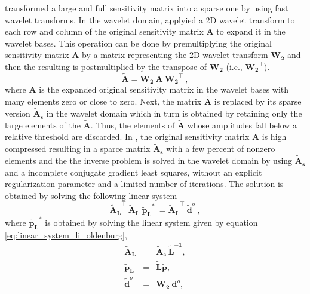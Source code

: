 \cite{li-oldenburg2010} transformed a large and full sensitivity matrix into a sparse one by using fast wavelet transforms.
In the wavelet domain, \cite{li-oldenburg2010} applyied a 2D wavelet transform to each row and column of the original sensitivity matrix $\mathbf{A}$ to expand it in the wavelet bases. 
This operation can be done by premultiplying the original sensitivity matrix $\mathbf{A}$ by a 
matrix representing the 2D wavelet transform $\mathbf{W_2}$ and then the resulting is postmultiplied by 
the transpose of $\mathbf{W_2}$ (i.e., $\mathbf{W_2}^{\top}$).
\begin{equation}
	\mathbf{\tilde{A}} = \mathbf{W_2} \: \mathbf{A}  \: \mathbf{W_2}^{\top} \:,
	\label{eq:A_li_oldenburg}
\end{equation}
where $\mathbf{\tilde{A}}$ is the expanded original sensitivity matrix in the wavelet bases with many elements zero or close to zero.
Next, the matrix $\mathbf{\tilde{A}}$ is replaced by its sparse version $\mathbf{\tilde{A}_{s}}$ 
in the wavelet domain which in turn is obtained by retaining only 
the large elements of the $\mathbf{\tilde{A}}$.
Thus, the elements of  $\mathbf{\tilde{A}}$ whose  amplitudes fall below a relative threshold are discarded.
In \cite{li-oldenburg2010}, the original sensitivity matrix $\mathbf{A}$ is high compressed resulting in 
a sparce matrix $\mathbf{\tilde{A}_{s}}$ with a few percent of nonzero elements and 
the the inverse problem is solved in the wavelet domain by using $\mathbf{\tilde{A}_{s}}$ and 
a incomplete conjugate gradient least squares, without an explicit regularization parameter and 
a limited number of iterations.
The solution is obtained by solving the following linear system
\begin{equation}
	 \mathbf{\tilde{A}_{L}}^{\top} \: \mathbf{\tilde{A}_{L}} \: \mathbf{\tilde{p}_{L}}^{\ast} \: =  
	 \mathbf{\tilde{A}_{L}}^{\top} \: \mathbf{\tilde{d}}^{o} \: ,
	\label{eq:linear_system_li_oldenburg}
\end{equation}
where $\mathbf{\tilde{p}_{L}}^{\ast}$ is obtained by solving the linear system given by equation
\ref{eq:linear_system_li_oldenburg},
\begin{subequations}
\begin{eqnarray}
\mathbf{\tilde{A}_{L}} &=& \mathbf{\tilde{A}_{s}} \: \mathbf{\tilde{L}^{-1}}, \\
\mathbf{\tilde{p}_{L}} &=& \mathbf{\tilde{L}} \mathbf{\tilde{p}}, \\
\mathbf{\tilde{d}}^{o} &=&  \mathbf{W_2} \: \mathbf{d}^{o}, 
\end{eqnarray}
\label{eq:pl_system_li_oldenburg}
\end{subequations}
